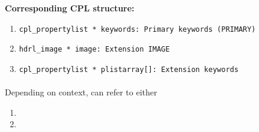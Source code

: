 \begin{datastructdef}
    \textbf{Corresponding \ac{CPL} structure:}
    \begin{enumerate}
            \item \texttt{cpl\_propertylist * keywords: Primary keywords (PRIMARY)}
            \item \texttt{hdrl\_image * image: Extension IMAGE}
            \item \texttt{cpl\_propertylist * plistarray[]: Extension keywords}
    \end{enumerate}
\end{datastructdef}

\paragraph{}\label{dataitem:det_dist_reduced}
Depending on context,  can refer to either
\begin{enumerate}
\item {}
\item {}
\end{enumerate}



